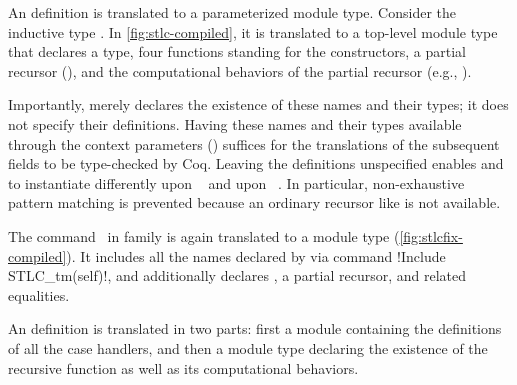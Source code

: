 



An  definition is translated to a parameterized module type.
Consider the inductive type .
In \cref{fig:stlc-compiled}, it is translated to a top-level module type
 that declares a  type,
four functions standing for the constructors,
a partial recursor (),
and the computational behaviors of the partial recursor
(e.g., ). %

Importantly,
 merely declares the existence of these names and their types;
it does not specify their definitions.
Having these names and their types available through the context parameters ()
suffices for the translations of the subsequent fields to be type-checked by Coq.
Leaving the definitions unspecified enables  and 
to instantiate  differently upon ~ and upon ~.
In particular, non-exhaustive pattern matching is prevented because
an ordinary recursor like  is not available.

The command \dadada~in family
 is again translated to a module type  (\cref{fig:stlcfix-compiled}).
It includes all the names declared by 
via command \lsti!Include STLC\_tm(self)!,
and additionally declares , a partial recursor, and related equalities.



An  definition is translated in two parts:
first a module containing the definitions of all the case handlers,
and then a module type declaring the existence of the recursive function as well as
its computational behaviors.

